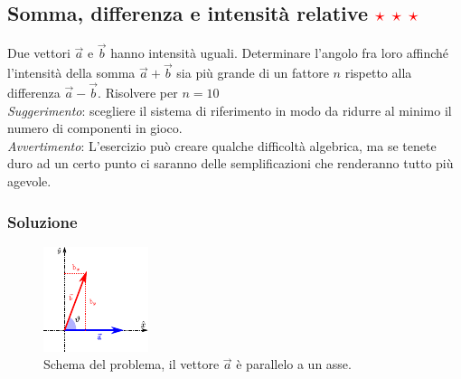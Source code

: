 \documentclass[12pt,a4paper]{book}
\newcommand{\rstar}{ \textcolor{red}{$\star$}}
\begin{document}
\subsection{Somma, differenza e intensità relative \rstar\rstar\rstar}
Due vettori $\vec{a}$ e $\vec{b}$ hanno intensità uguali. Determinare l'angolo fra loro affinché l'intensità della somma $\vec{a} + \vec{b}$ sia più grande di un fattore $n$ rispetto alla differenza $\vec{a}-\vec{b}$. Risolvere per $n=10$\\
\textit{Suggerimento}: scegliere il sistema di riferimento in modo da ridurre al minimo il numero di componenti in gioco. \\
\textit{Avvertimento}: L'esercizio può creare qualche difficoltà algebrica, ma se tenete duro ad un certo punto ci saranno delle semplificazioni che renderanno tutto più agevole.

\subsubsection*{Soluzione}

\begin{figure}[h]
 \centering
\includegraphics[scale=3.3]{sum_diff.pdf}
 \caption{Schema del problema, il vettore $\vec{a}$ è parallelo a un asse.}
 \label{fig:sum_diff}
\end{figure}
\end{document}
